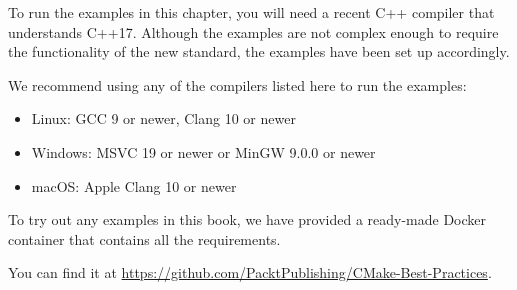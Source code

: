 To run the examples in this chapter, you will need a recent C++ compiler that understands C++17. Although the examples are not complex enough to require the functionality of the new standard, the examples have been set up accordingly.

We recommend using any of the compilers listed here to run the examples:

\begin{itemize}
\item Linux: GCC 9 or newer, Clang 10 or newer
\item Windows: MSVC 19 or newer or MinGW 9.0.0 or newer
\item macOS: Apple Clang 10 or newer
\end{itemize}

\begin{tcolorbox}[colback=webgreen!5!white,colframe=webgreen!75!black,title=Note]
To try out any examples in this book, we have provided a ready-made Docker container that contains all the requirements.

You can find it at \url{https://github.com/PacktPublishing/CMake-Best-Practices}.
\end{tcolorbox}